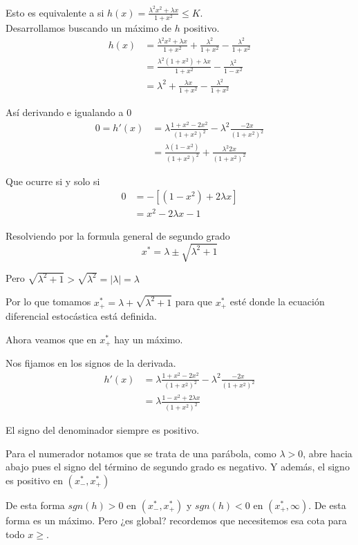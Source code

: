 \documentclass[12pt]{article}
\begin{document}
Esto es equivalente a si $h(x) = \frac{\lambda^2 x^2 + \lambda x}{1+x^2} \leq K.$\\

Desarrollamos buscando un máximo de $h$ positivo.
\begin{align*}
	h(x) & = \frac{\lambda^2 x^2 + \lambda x}{1+x^2} + \frac{\lambda^2}{1+x^2} - \frac{\lambda^2}{1+x^2}\\
	 &= \frac{\lambda^2 (1+x^2) + \lambda x}{1+x^2} - \frac{\lambda^2}{1-x^2}\\
	 &= \lambda^2 + \frac{\lambda x}{1+x^2} - \frac{\lambda^2}{1+x^2}
\end{align*}

Así derivando e igualando a 0
\begin{align*}
	0 = h'(x)& = \lambda \frac{1+x^2 -2x^2}{(1+x^2)^2} - \lambda^2 \frac{-2x}{(1+x^2)^2}\\
	&= \frac{\lambda (1-x^2)}{(1+x^2)^2} + \frac{\lambda^2 2x}{(1+x^2)^2}
\end{align*}

Que ocurre si y solo si
\begin{align*}
	0 & =-[ (1-x^2) +2 \lambda x]\\
	&=  x^2 -2\lambda x - 1
\end{align*}

Resolviendo por la formula general de segundo grado
$$x^* = \lambda \pm \sqrt{\lambda^2 +1}  $$

Pero $\sqrt{\lambda^2 +1 } > \sqrt{\lambda^2} = |\lambda| = \lambda$

Por lo que tomamos $x^*_+ = \lambda + \sqrt{\lambda^2 +1}$ para que $x^*_+$ esté donde la ecuación diferencial estocástica está definida.

Ahora veamos que en $x^*_+$ hay un máximo.

Nos fijamos en los signos de la derivada.
\begin{align*}
	h'(x) &= \lambda \frac{1+x^2 -2x^2}{(1+x^2)^2} - \lambda^2 \frac{-2x}{(1+x^2)^2} \\
	& =\lambda \frac{1-x^2 + 2 \lambda x}{(1+x^2)^2}
\end{align*}

El signo del denominador siempre es positivo.

Para el numerador notamos que se trata de una parábola, como $\lambda > 0$, abre hacia abajo pues el signo del término de segundo grado es negativo. Y además, el signo es positivo en $(x^*_-, x^*_+)$

De esta forma $sgn(h)>0$ en $(x^*_-, x^*_+)$ y $sgn(h)<0$ en $(x^*_+,\infty).$
De esta forma es un máximo. Pero ¿es global? recordemos que necesitemos esa cota para todo $x\geq$.\\
\end{document}
